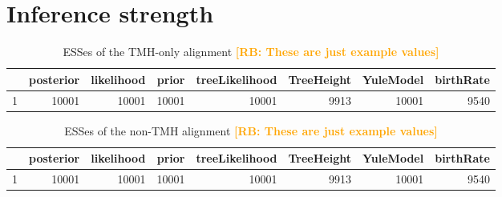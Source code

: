 \documentclass{article}
\newcommand{\richel}[1]{\textcolor{orange}{\textbf{[RB: #1]}}}
\begin{document}
\section{Inference strength}

\begin{table}[ht]
\centering
\begin{tabular}{rrrrrrrr}
  \hline
 & posterior & likelihood & prior & treeLikelihood & TreeHeight & YuleModel & birthRate \\ 
  \hline
1 & 10001 & 10001 & 10001 & 10001 & 9913 & 10001 & 9540 \\ 
   \hline
\end{tabular}
\caption{
  ESSes of the TMH-only alignment
  \richel{These are just example values}
} 
\label{tab:esses_tmh}
\end{table}

\begin{table}[ht]
\centering
\begin{tabular}{rrrrrrrr}
  \hline
 & posterior & likelihood & prior & treeLikelihood & TreeHeight & YuleModel & birthRate \\ 
  \hline
1 & 10001 & 10001 & 10001 & 10001 & 9913 & 10001 & 9540 \\ 
   \hline
\end{tabular}
\caption{
  ESSes of the non-TMH alignment
  \richel{These are just example values}
} 
\label{tab:esses_non_tmh}
\end{table}
\end{document}
